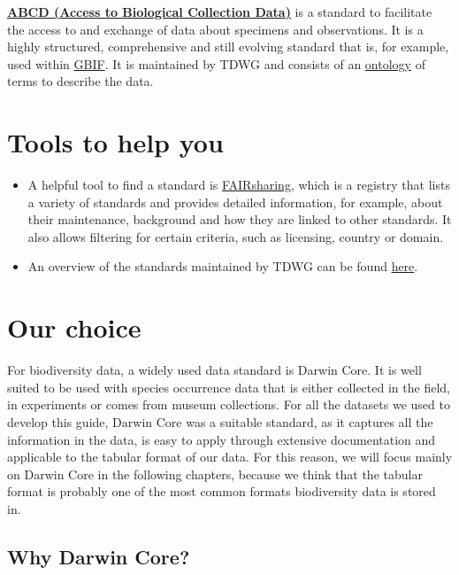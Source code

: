 \documentclass[
  oneside]{book}
\begin{document}
\href{https://abcd.tdwg.org/}{\textbf{ABCD (Access to Biological Collection Data)}} is a standard to facilitate the access to and exchange of data about specimens and observations. It is a highly structured, comprehensive and still evolving standard that is, for example, used within \hyperref[GBIF]{GBIF}. It is maintained by TDWG and consists of an \hyperref[ontology]{ontology} of terms to describe the data.

\section{Tools to help you}\label{tools-to-help-you-1}

\begin{itemize}
\item
  A helpful tool to find a standard is \href{https://fairsharing.org/search?fairsharingRegistry=Standard}{FAIRsharing}, which is a registry that lists a variety of standards and provides detailed information, for example, about their maintenance, background and how they are linked to other standards. It also allows filtering for certain criteria, such as licensing, country or domain.
\item
  An overview of the standards maintained by TDWG can be found \href{https://www.tdwg.org/standards/}{here}.
\end{itemize}

\section{Our choice}\label{our-choice-1}

For biodiversity data, a widely used data standard is Darwin Core. It is well suited to be used with species occurrence data that is either collected in the field, in experiments or comes from museum collections. For all the datasets we used to develop this guide, Darwin Core was a suitable standard, as it captures all the information in the data, is easy to apply through extensive documentation and applicable to the tabular format of our data. For this reason, we will focus mainly on Darwin Core in the following chapters, because we think that the tabular format is probably one of the most common formats biodiversity data is stored in.

\subsection{Why Darwin Core?}\label{why-darwin-core}
\end{document}
